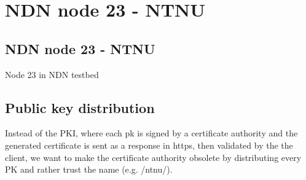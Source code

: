 \chapter{NDN node 23 - NTNU}\label{chp4:} 

\section{NDN node 23 - NTNU}
Node 23 in NDN testbed


\section{Public key distribution}
Instead of the PKI, where each pk is signed by a certificate authority and the generated certificate is sent as a response in https, then validated by the the client, we want to make the certificate authority obsolete by distributing every PK and rather trust the name (e.g. /ntnu/). 